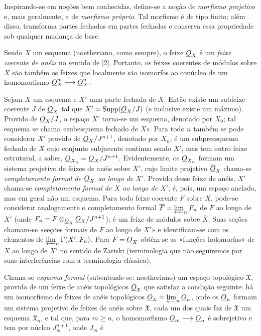 Inspirando-se em noções bem conhecidas, define-se a noção de
\emph{morfismo projetivo} e, mais geralmente, a de \emph{morfismo próprio}.
Tal morfismo é de tipo finito; além disso, transforma partes fechadas em partes
fechadas e conserva essa propriedade sob qualquer mudança de base.

Sendo $X$ um esquema (noetheriano, como sempre), o feixe $\underline{O}_X$ é um
\emph{feixe coerente de anéis} no sentido de [2]. Portanto, os feixes
coerentes de módulos sobre $X$ são também os feixes que localmente são
isomorfos ao conúcleo de um homomorfismo
$\underline{O}_X^{m}\longrightarrow\underline{O}_X^{n}$.


Sejam $X$ um esquema e $X'$ uma parte fechada de $X$. Então existe um
subfeixe coerente $J$ de $\underline{O}_X$ tal que
$X'=\operatorname{Supp}(\underline{O}_X/J)$ (e inclusive existe um máximo). Provido de
$\underline{O}_X/J$, o espaço $X'$ torna-se um esquema, denotado por $X_0$;
tal esquema se chama «subesquema fechado de $X$». Para todo $n$ também se
pode considerar $X'$ provido de $\underline{O}_X/J^{n+1}$, denotado por $X_n$;
é um subpreesquema fechado de $X$ cujo conjunto subjacente continua sendo $X'$,
mas tem outro feixe estrutural, a saber,
$\underline{O}_{X_n}=\underline{O}_X/J^{n+1}$. Evidentemente, os $\underline{O}_{X_n}$ formam um sistema
projetivo de feixes de anéis sobre $X'$, cujo limite projetivo
$\overline{\underline{O}}_X$ chama-se \emph{completamento formal de $\underline{O}_X$ ao longo
de $X'$}. Provido desse feixe de anéis, $X'$ chama-se \emph{completamento
formal de $X$ ao longo de $X'$}; é, pois, um espaço anelado, mas em
geral não um esquema. Para todo feixe coerente $F$ sobre $X$, pode-se considerar
analogamente o completamento formal $\overline F=\varprojlim_n F_n$ de $F$ ao
longo de $X'$ (onde $F_n=F\otimes_{\underline{O}_X}\underline{O}_X/J^{n+1}$); é um feixe de
módulos sobre $\overline X$. Suas seções chamam-se «seções formais de $F$
ao longo de $X'$» e identificam-se com os elementos de
$\varprojlim_n\Gamma(X',F_n)$. Para $F=\underline{O}_X$ obtêm-se as «funções
holomorfas» de $X$ ao longo de $X'$ no sentido de Zariski (terminologia que
não seguiremos por suas interferências com a terminologia clássica).

Chama-se \emph{esquema formal} (subentende-se: noetheriano) um espaço
topológico $\mathfrak X$, provido de um feixe de anéis topológicos
$\underline{O}_{\mathfrak X}$ que satisfaz a condição seguinte: há um isomorfismo
de feixes de anéis topológicos
$\underline{O}_{\mathfrak X}=\varprojlim_n\underline{O}_n$, onde os $\underline{O}_n$ formam um sistema
projetivo de feixes de anéis sobre $\mathfrak X$, cada um dos quais faz
de $\mathfrak X$ um esquema $\mathfrak X_n$, e tal que, para $m\geq n$, o
homomorfismo $\underline{O}_m\longrightarrow\underline{O}_n$ é sobrejetivo e tem por núcleo
$J_m^{n+1}$, onde $J_m$ é

